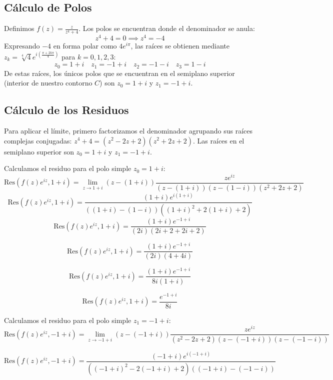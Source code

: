 \documentclass[a4paper, 12pt]{article}
\begin{document}
\subsection*{Cálculo de Polos}
Definimos $f(z) = \frac{z}{z^4+4}$. Los polos se encuentran donde el denominador se anula:
\[
z^4 + 4 = 0 \implies z^4 = -4
\]
Expresando $-4$ en forma polar como $4e^{i\pi}$, las raíces se obtienen mediante $z_k = \sqrt[4]{4} e^{i(\frac{\pi + 2k\pi}{4})}$ para $k=0,1,2,3$:
\[\boxed{
z_0 = 1+i} \quad \boxed{z_1 = -1+i} \quad \boxed{z_2 = -1-i} \quad \boxed{z_3 = 1-i
}\]
De estas raíces, los únicos polos que se encuentran en el semiplano superior (interior de nuestro contorno $C$) son $z_0 = 1+i$ y $z_1 = -1+i$.

\subsection*{Cálculo de los Residuos}
Para aplicar el límite, primero factorizamos el denominador agrupando sus raíces complejas conjugadas: $z^4+4 = (z^2-2z+2)(z^2+2z+2)$. Las raíces en el semiplano superior son $z_0 = 1+i$ y $z_1 = -1+i$.

Calculamos el residuo para el polo simple $z_0 = 1+i$:
\[
\text{Res}(f(z)e^{iz}, 1+i) = \lim_{z \to 1+i} (z-(1+i)) \frac{z e^{iz}}{(z-(1+i))(z-(1-i))(z^2+2z+2)}
\]
\[
\text{Res}(f(z)e^{iz}, 1+i) = \frac{(1+i) e^{i(1+i)}}{((1+i)-(1-i))((1+i)^2+2(1+i)+2)}
\]
\[
\text{Res}(f(z)e^{iz}, 1+i) = \frac{(1+i) e^{-1+i}}{(2i)(2i+2+2i+2)}\]

\vspace{0.3cm}

\[
\text{Res}(f(z)e^{iz}, 1+i) = \frac{(1+i) e^{-1+i}}{(2i)(4+4i)} 
\]

\vspace{0.3cm}

\[
\text{Res}(f(z)e^{iz}, 1+i) = \frac{(1+i) e^{-1+i}}{8i(1+i)} 
\]

\vspace{0.3cm}

\[
\text{Res}(f(z)e^{iz}, 1+i) =\frac{e^{-1+i}}{8i}
\]

\vspace{0.3cm}

Calculamos el residuo para el polo simple $z_1 = -1+i$:
\[
\text{Res}(f(z)e^{iz}, -1+i) = \lim_{z \to -1+i} (z-(-1+i)) \frac{z e^{iz}}{(z^2-2z+2)(z-(-1+i))(z-(-1-i))}
\]

\[
\text{Res}(f(z)e^{iz}, -1+i) = \frac{(-1+i) e^{i(-1+i)}}{((-1+i)^2-2(-1+i)+2)((-1+i)-(-1-i))}
\]
\end{document}

